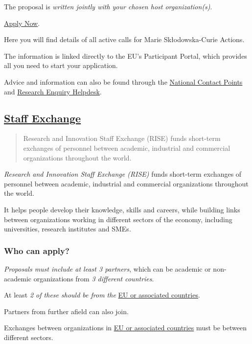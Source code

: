 \documentclass[oneside]{book}
\numberwithin{equation}{section}
\begin{document}
The proposal is \textit{written jointly with your chosen host organization(s)}.

\href{https://ec.europa.eu/research/mariecurieactions/actions/get-funding_en}{Apply Now}.

Here you will find details of all active calls for Marie Skłodowska-Curie Actions.

The information is linked directly to the EU's Participant Portal, which provides all you need to start your application.

%
Advice and information can also be found through the \href{http://ec.europa.eu/research/participants/portal/desktop/en/support/national_contact_points.html}{National Contact Points} and \href{http://ec.europa.eu/research/index.cfm?pg=enquiries}{Research Enquiry Helpdesk}.

\subsection{\href{https://ec.europa.eu/research/mariecurieactions/actions/staff-exchange_en}{Staff Exchange}}
\begin{quotation}
    Research and Innovation Staff Exchange (RISE) funds short-term exchanges of personnel between academic, industrial and commercial organizations throughout the world.
\end{quotation}
\textit{Research and Innovation Staff Exchange (RISE)} funds short-term exchanges of personnel between academic, industrial and commercial organizations throughout the world.

%
It helps people develop their knowledge, skills and careers, while building links between organizations working in different sectors of the economy, including universities, research institutes and SMEs.

\subsubsection{Who can apply?}
\textit{Proposals must include at least 3 partners}, which can be academic or non-academic organizations from \textit{3 different countries}.

At least \textit{2 of these should be from the} \href{http://ec.europa.eu/research/participants/data/ref/h2020/other/wp/2016-2017/annexes/h2020-wp1617-annex-a-countries-rules_en.pdf}{EU or associated countries}.

Partners from further afield can also join.

%
Exchanges between organizations in \href{http://ec.europa.eu/research/participants/data/ref/h2020/other/wp/2016-2017/annexes/h2020-wp1617-annex-a-countries-rules_en.pdf}{EU or associated countries} must be between different sectors.
\end{document}
